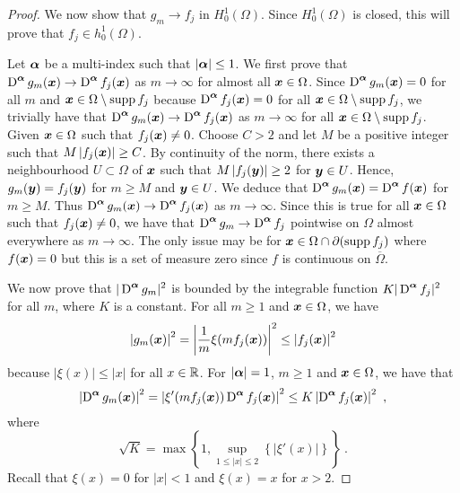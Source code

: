 \begin{proof}
We now show that $g_m \rightarrow f_j$ in $\displaystyle H^1_0(\Omega)$.
Since $\displaystyle H^1_0(\Omega)$ is closed, this will prove that
$\displaystyle f_j \in h^1_0(\Omega)$.

Let ${\bm{\alpha}}$ be a multi-index such that $|{\bm{\alpha}}|\leq 1$.
We first prove that $\displaystyle \operatorname{D}^{{\bm{\alpha}}} g_m({\bm{x}}) \rightarrow
\operatorname{D}^{{\bm{\alpha}}} f_j({\bm{x}})$ as $m\rightarrow \infty$ for almost all
${\bm{x}}\in \Omega$.
Since $\displaystyle \operatorname{D}^{{\bm{\alpha}}} g_m({\bm{x}})=0$ for all $m$ and
${\bm{x}} \in \Omega \setminus \operatorname{supp} f_j$ because
$\displaystyle \operatorname{D}^{{\bm{\alpha}}} f_j({\bm{x}})=0$ for all
${\bm{x}} \in \Omega \setminus \operatorname{supp} f_j$,
we trivially have that
$\displaystyle \operatorname{D}^{{\bm{\alpha}}} g_m({\bm{x}})
\rightarrow \operatorname{D}^{{\bm{\alpha}}} f_j({\bm{x}})$
as $m\rightarrow \infty$ for all ${\bm{x}} \in \Omega \setminus \operatorname{supp} f_j$.
Given ${\bm{x}} \in \Omega$ such that $f_j({\bm{x}}) \neq 0$.
Choose $\displaystyle C> 2$ and let $M$ be a positive integer such that
$\displaystyle M \left|f_j({\bm{x}})\right|\geq C$.  By continuity of the
norm, there exists a neighbourhood $U\subset \Omega$ of ${\bm{x}}$ such that 
$\displaystyle M \left|f_j({\bm{y}})\right|\geq 2$ for ${\bm{y}} \in U$.
Hence, $g_m({\bm{y}}) = f_j({\bm{y}})$ for $m\geq M$ and ${\bm{y}} \in U$.
We deduce that
$\displaystyle \operatorname{D}^{{\bm{\alpha}}} g_m({\bm{x}})
= \operatorname{D}^{{\bm{\alpha}}} f({\bm{x}})$
for $m\geq M$. 
Thus $\displaystyle \operatorname{D}^{{\bm{\alpha}}} g_m({\bm{x}}) \rightarrow
\operatorname{D}^{{\bm{\alpha}}} f_j({\bm{x}})$ as
$m\rightarrow \infty$.  Since this is true for all ${\bm{x}} \in \Omega$ such
that $f_j({\bm{x}}) \neq 0$, we have that
$\displaystyle \operatorname{D}^{{\bm{\alpha}}} g_m \rightarrow
\operatorname{D}^{{\bm{\alpha}}} f_j$ pointwise
on $\Omega$ almost everywhere as $m\rightarrow \infty$.  The only
issue may be for ${\bm{x}} \in \Omega \cap \partial (\operatorname{supp} f_j)$ where
$f({\bm{x}}) = 0$ but this is a set of measure zero since $f$ is
continuous on $\overline{\Omega}$.

We now prove that $\displaystyle |\operatorname{D}^{{\bm{\alpha}}} g_m|^2$ is bounded by
the integrable function $\displaystyle K |\operatorname{D}^{{\bm{\alpha}}} f_j|^2$ for all
$m$, where $K$ is a constant.  For all $m \geq 1$ and
${\bm{x}} \in \Omega$, we have
\[
\left| g_m({\bm{x}}) \right|^2 =
\left| \frac{1}{m} \xi(mf_j({\bm{x}})) \right|^2
\leq \left| f_j({\bm{x}}) \right|^2
\]
because $|\xi(x)|\leq |x|$ for all $x \in \mathbb{R}$.  For $|{\bm{\alpha}}|=1$,
$m \geq 1$ and ${\bm{x}}\in \Omega$, we have that
\[
\left| \operatorname{D}^{{\bm{\alpha}}} g_m({\bm{x}}) \right|^2 =
\left| \xi'(mf_j({\bm{x}})) \operatorname{D}^{{\bm{\alpha}}} f_j({\bm{x}}) \right|^2
\leq K \left| \operatorname{D}^{{\bm{\alpha}}} f_j({\bm{x}}) \right|^2 \ ,
\]
where
\[
\sqrt{K} = \max \left\{ 1,
\sup_{1\leq |x|\leq 2} \left\{ |\xi'(x)| \right\} \right\} \ .
\]
Recall that $\xi(x) =0$ for $|x|<1$ and $\xi(x) = x$ for $x>2$.


\end{proof}
